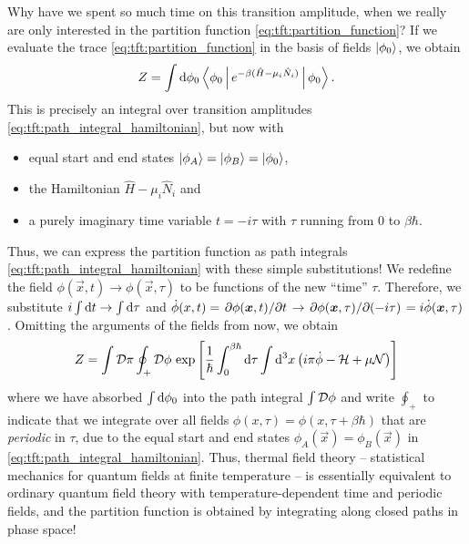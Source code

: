 Why have we spent so much time on this transition amplitude, when we really are only interested in the partition function \eqref{eq:tft:partition_function}?
If we evaluate the trace \eqref{eq:tft:partition_function} in the basis of fields $\ket{\phi_0}$, we obtain
\begin{equation}
	Z = \int \mathop{}\!\mathrm{d} \phi_0 \Braket{\phi_0 | e^{-\beta (\hat{H} - \mu_i \hat{N}_i)} | \phi_0} .
\end{equation}
This is precisely an integral over transition amplitudes \eqref{eq:tft:path_integral_hamiltonian}, but now with 
\begin{itemize}
\item equal start and end states $\ket{\phi_A} = \ket{\phi_B} = \ket{\phi_0}$, 
\item the Hamiltonian $\hat{H} - \mu_i \hat{N}_i$ and 
\item a purely imaginary time variable $t = -i \tau$ with $\tau$ running from $0$ to $\beta \hbar$.
\end{itemize}
Thus, we can express the partition function as path integrals \eqref{eq:tft:path_integral_hamiltonian} with these simple substitutions!
We redefine the field $\phi(\vec{x}, t) \rightarrow \phi(\vec{x}, \tau)$ to be functions of the new ``time'' $\tau$.
Therefore, we substitute $i \int \mathop{}\!\mathrm{d} t \rightarrow \int \mathop{}\!\mathrm{d} \tau$ and $\dot\phi(x, t) = \pdv{\phi({\bm{x}},t)}/{t} \rightarrow \pdv{\phi({\bm{x}},\tau)}/{(-i \tau)} = i \dot\phi({\bm{x}},\tau)$.
Omitting the arguments of the fields from now, we obtain
\begin{equation}
	Z = \int \mathcal{D} \pi \oint_+ \mathcal{D} \phi \, \exp \left[ \frac{1}{\hbar} \int_0^{\beta \hbar} \mathop{}\!\mathrm{d} \tau \int \mathop{}\!\mathrm{d}^3 x \left( i \pi \dot{\phi} - \mathcal{H} + \mu \mathcal{N} \right) \right]
\label{eq:tft:bosonic_partition_function}
\end{equation}
where we have absorbed $\int \mathop{}\!\mathrm{d} \phi_0$ into the path integral $\int \mathcal{D} \phi$ and write $\oint_+$ to indicate that we integrate over all fields $\phi(x, \tau) = \phi(x, \tau + \beta \hbar)$ that are \emph{periodic} in $\tau$, due to the equal start and end states $\phi_A(\vec{x}) = \phi_B(\vec{x})$ in \cref{eq:tft:path_integral_hamiltonian}.
Thus, thermal field theory -- statistical mechanics for quantum fields at finite temperature -- is essentially equivalent to ordinary quantum field theory with temperature-dependent time and periodic fields, and the partition function is obtained by integrating along closed paths in phase space!

